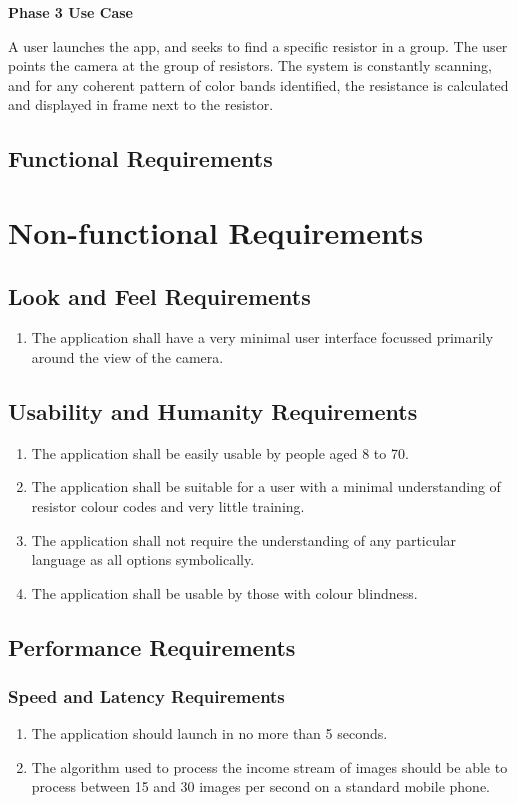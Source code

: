 \documentclass{article}
\begin{document}
\textbf{ Phase 3 Use Case}

A user launches the app, and seeks to find a specific resistor in a group.
The user points the camera at the group of resistors.
The system is constantly scanning, and for any coherent pattern of color bands identified, the resistance is calculated and displayed in frame next to the resistor.

\subsection{Functional Requirements}

\section{Non-functional Requirements}

\subsection{Look and Feel Requirements }
\begin{enumerate}
\item The application shall have a very minimal user interface focussed primarily around the view of the camera.
\end{enumerate}
\subsection{Usability and Humanity Requirements}
\begin{enumerate}
\item The application shall be easily usable by people aged 8 to 70.
\item The application shall be suitable for a user with a minimal understanding of resistor colour codes and very little training.
\item The application shall not require the understanding of any particular language as all options symbolically.
\item The application shall be usable by those with colour blindness.
\end{enumerate}
\subsection{Performance Requirements}
\subsubsection{Speed and Latency Requirements}
\begin{enumerate}
\item The application should launch in no more than 5 seconds.
\item The algorithm used to process the income stream of images should be able to process between 15 and 30 images per second on a standard mobile phone.
\end{enumerate}
\end{document}
